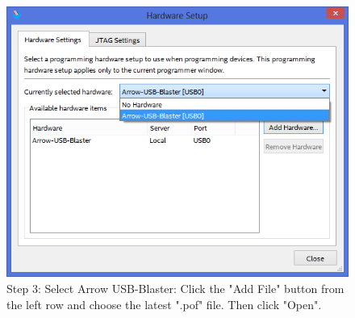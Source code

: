 \begin{figure}[H]
  \centering
  \includegraphics[width=0.8\linewidth]{images/max10_03.png}
  \captionsetup{width=0.8\linewidth}
  \caption{Step 3: Select Arrow USB-Blaster:
           Click the "Add File" button from the left row and choose the
           latest ".pof" file. Then click "Open".}
  \label{fig:max10_03}
\end{figure}


